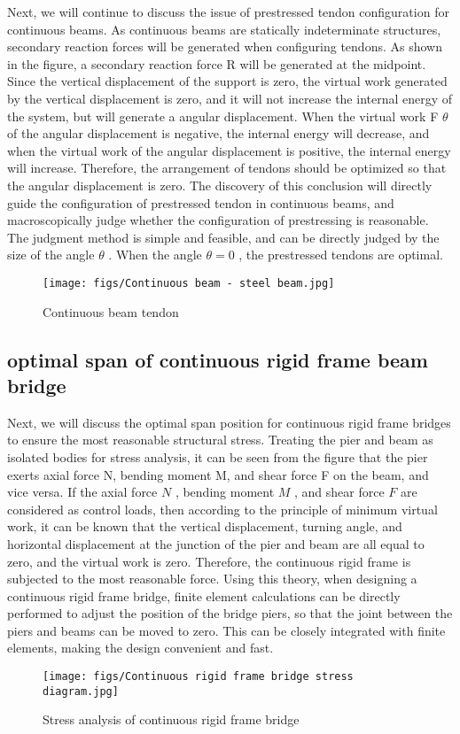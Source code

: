 Next, we will continue to discuss the issue of prestressed tendon configuration for continuous beams. As continuous beams are statically indeterminate structures, secondary reaction forces will be generated when configuring tendons. As shown in the figure, a secondary reaction force R will be generated at the midpoint. Since the vertical displacement of the support is zero, the virtual work generated by the vertical displacement is zero, and it will not increase the internal energy of the system, but will generate a angular displacement. When the virtual work F $ \theta $ of the angular displacement is negative, the internal energy will decrease, and when the virtual work of the angular displacement is positive, the internal energy will increase. Therefore, the arrangement of tendons should be optimized so that the angular displacement is zero. The discovery of this conclusion will directly guide the configuration of prestressed tendon in continuous beams, and macroscopically judge whether the configuration of prestressing is reasonable. The judgment method is simple and feasible, and can be directly judged by the size of the angle $ \theta $ . When the angle $ \theta =0 $ , the prestressed tendons are optimal.
\begin{figure}[h!] %
    \centering
    \texttt{[image: figs/Continuous beam - steel beam.jpg]} 
    \caption{Continuous beam tendon}
    \label{fig:number}
\end{figure}


\subsection {optimal span of continuous rigid frame beam bridge}
Next, we will discuss the optimal span position for continuous rigid frame bridges to ensure the most reasonable structural stress.
Treating the pier and beam as isolated bodies for stress analysis, it can be seen from the figure that the pier exerts axial force N, bending moment M, and shear force F on the beam, and vice versa. If the axial force $ N $ , bending moment $ M $ , and shear force $ F $ are considered as control loads, then according to the principle of minimum virtual work, it can be known that the vertical displacement, turning angle, and horizontal displacement at the junction of the pier and beam are all equal to zero, and the virtual work is zero. Therefore, the continuous rigid frame is subjected to the most reasonable force. Using this theory, when designing a continuous rigid frame bridge, finite element calculations can be directly performed to adjust the position of the bridge piers, so that the joint between the piers and beams can be moved to zero. This can be closely integrated with finite elements, making the design convenient and fast.
\begin{figure}[h!] %
    \centering
    \texttt{[image: figs/Continuous rigid frame bridge stress diagram.jpg]} 
    \caption{Stress analysis of continuous rigid frame bridge}
    \label{fig:number}
\end{figure}

